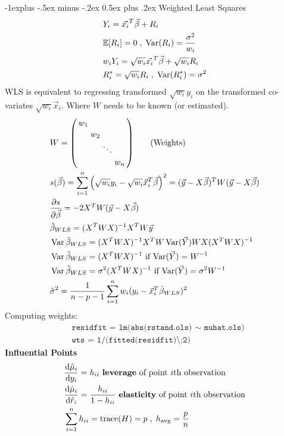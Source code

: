 \documentclass[letter, fleqn]{article}
\makeatletter
\renewcommand{\subsection}{\@startsection{subsection}{2}{0mm}%
                                {-1explus -.5ex minus -.2ex}%
                                {0.5ex plus .2ex}%
                                {\normalfont\normalsize\bfseries}}
\renewcommand{\v}{\Vec}
\makeatother
\begin{document}
\begin{multicols}{3}
\subsection{Weighted Least Squares}
\begin{align*}
    &Y_i = \v{x_i}^T\v{\beta} + R_i \\
    &\E[R_i] = 0 \;,\; \Var(R_i) = \frac{\sigma^2}{w_i}\\
    & w_iY_i =  \sqrt{w_i}\v{x_i}^T\v{\beta} + \sqrt{w_i}R_i\\
    & R_i^* = \sqrt{w_i}R_i \;,\; \Var(R_i^*) = \sigma^2
\end{align*}
WLS is equivalent to regressing transformed $\sqrt{w_i}y_i$ on the transformed co-variates 
$\sqrt{w_i}\v{x}_i$. Where $W$ needs to be known (or estimated).
\begin{align*}
    &W = \smqty(
    \dmat{w_1, w_2, \ddots, w_n}
    ) \tag{Weights}\\
    &s(\v{\beta}) = \nsum{i=1}{n}\left(
    \sqrt{w_i}y_i - \sqrt{w_i}\v{x}_i^T\v{\beta}
    \right)^2 = (\v{y} - X\v{\beta})^TW(\v{y}-X\v{\beta})\\
    &\pdv{s}{\v{\beta}} = -2X^TW(\v{y} - X\v{\beta})\\
    &\hat{\beta}_{WLS} = (X^TWX)^{-1}X^TW\v{y}\\
    &\Var{\tilde{\beta}_{WLS}} = (X^TWX)^{-1}X^TW\Var(\v{Y})WX(X^TWX)^{-1}\\
    &\Var{\tilde{\beta}_{WLS}} = (X^TWX)^{-1} \text{ if $\Var(\v{Y}) = W^{-1}$ }\\
    &\Var{\tilde{\beta}_{WLS}} = \sigma^2 (X^TWX)^{-1} \text{ if $\Var(\v{Y}) = \sigma^2 W^{-1}$ }\\
    & \hat{\sigma}^2 = \frac{1}{n-p-1} \nsum{i=1}{n}w_i(y_i - \v{x}_i^T\hat{\beta}_{WLS})^2
\end{align*}
Computing weights:
\begin{align*}
    &\texttt{residfit = lm(abs(rstand.ols) $\sim$ muhat.ols)}\\
    &\texttt{wts = 1/(fitted(residfit)\^\;2)}
\end{align*}
\textbf{Influential Points}
\begin{align*}
&\dv{\hat{\mu}_i}{y_i} = h_{ii} \text{ \textbf{leverage} of point $i$th observation}\\
&\dv{\hat{\mu}_i}{\hat{r}_i} = \frac{h_{ii}}{1-h_{ii}} \text{ \textbf{elasticity} of point $i$th observation}\\
&\nsum{i=1}{n}h_{ii} = \mathrm{trace}(H) = p \;,\; h_{\text{avg}} = \frac{p}{n}\\

\end{align*}
\end{multicols}
\end{document}
